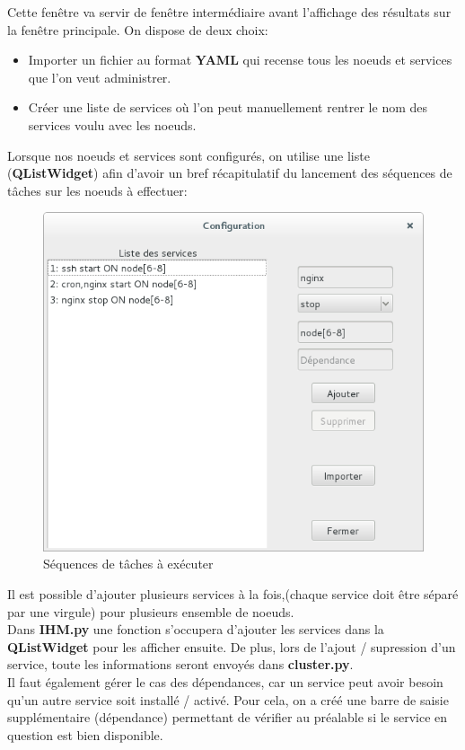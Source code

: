 \documentclass[a4paper,11pt]{article}
\begin{document}
Cette fenêtre va servir de fenêtre intermédiaire avant l'affichage des résultats sur la fenêtre principale. 
On dispose de deux choix:
\begin{itemize}
\item Importer un fichier au format \textbf{YAML} qui recense tous les noeuds et services que l'on veut administrer.
\item Créer une liste de services où l'on peut manuellement rentrer le nom des services voulu avec les noeuds.
\end{itemize}
Lorsque nos noeuds et services sont configurés, on utilise une liste (\textbf{QListWidget}) afin d'avoir un bref récapitulatif du lancement des séquences de tâches sur les noeuds à effectuer:
\begin{figure}[H]
\centering
\includegraphics[scale=0.5]{exemple_config_service.png}
\caption{Séquences de tâches à exécuter}
\end{figure}
Il est possible d'ajouter plusieurs services à la fois,(chaque service doit être séparé par une virgule) pour plusieurs ensemble de noeuds.\\
Dans \textbf{IHM.py} une fonction s'occupera d'ajouter les services dans la \textbf{QListWidget} pour les afficher ensuite. De plus,  lors de l'ajout / supression d'un service, toute les informations seront envoyés dans \textbf{cluster.py}.\\
Il faut également gérer le cas des dépendances, car un service peut avoir besoin qu'un autre service soit installé / activé. Pour cela, on a créé une barre de saisie supplémentaire (dépendance) permettant de vérifier au préalable si le service en question est bien disponible.
\end{document}
